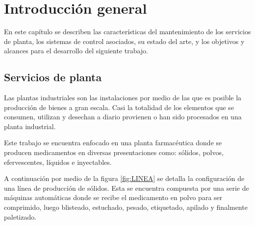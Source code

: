 
\chapter{Introducción general} %

\label{Chapter1} %
\label{IntroGeneral}


\newcommand{\keyword}[1]{\textbf{#1}}
\newcommand{\tabhead}[1]{\textbf{#1}}
\newcommand{\code}[1]{\texttt{#1}}
\newcommand{\file}[1]{\texttt{\bfseries#1}}
\newcommand{\option}[1]{\texttt{\itshape#1}}
\newcommand{\grados}{$^{\circ}$}



En este capítulo se describen las características del mantenimiento de los servicios de planta, los sistemas de control asociados, su estado del arte, y los objetivos y alcances para el desarrollo del siguiente trabajo.

\section{Servicios de planta}

Las plantas industriales son las instalaciones por medio de las que es posible la producción de bienes a gran escala. Casi la totalidad de los elementos que se consumen, utilizan y desechan a diario provienen o han sido procesados en una planta industrial. 

Este trabajo se encuentra enfocado en una planta farmacéutica donde se producen medicamentos en diversas presentaciones como: sólidos, polvos, efervescentes, líquidos e inyectables.

A continuación por medio de la figura \ref{fig:LINEA} se detalla la configuración de una línea de producción de sólidos. Esta se encuentra compuesta por una serie de máquinas automáticas donde se recibe el medicamento en polvo para ser comprimido, luego blisteado, estuchado, pesado, etiquetado, apilado y finalmente paletizado.

